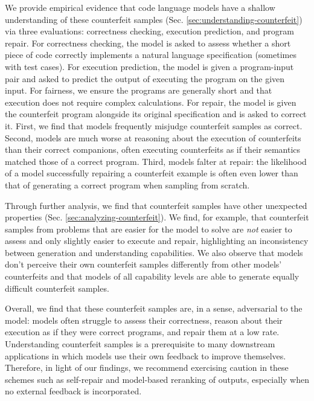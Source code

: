 We provide empirical evidence that code language models have a shallow understanding of these counterfeit samples (Sec. \ref{sec:understanding-counterfeit}) via three evaluations: correctness checking, execution prediction, and program repair. For correctness checking, the model is asked to assess whether a short piece of code correctly implements a natural language specification (sometimes with test cases). For execution prediction, the model is given a program-input pair and asked to predict the output of executing the program on the given input. For fairness, we ensure the programs are generally short and that execution does not require complex calculations. For repair, the model is given the counterfeit program alongside its original specification and is asked to correct it. First, we find that models frequently misjudge counterfeit samples as correct. Second, models are much worse at reasoning about the execution of counterfeits than their correct companions, often executing counterfeits as if their semantics matched those of a correct program. Third, models falter at repair: the likelihood of a model successfully repairing a counterfeit example is often even lower than that of generating a correct program when sampling from scratch.

Through further analysis, we find that counterfeit samples have other unexpected properties
(Sec. \ref{sec:analyzing-counterfeit}). We find, for example, that counterfeit samples from problems that are easier for the model to solve are \textit{not} easier to assess and only slightly easier to execute and repair, highlighting an inconsistency between generation and understanding capabilities. We also observe that models don't perceive their own counterfeit samples differently from other models' counterfeits and that models of all capability levels are able to generate equally difficult counterfeit samples.

Overall, we find that these counterfeit samples are, in a sense, adversarial to the model: models often struggle to assess their correctness, reason about their execution as if they were correct programs, and repair them at a low rate. Understanding counterfeit samples is a prerequisite to many downstream applications in which models use their own feedback to improve themselves. Therefore, in light of our findings, we recommend exercising caution in these schemes such as self-repair and model-based reranking of outputs, especially when no external feedback is incorporated.